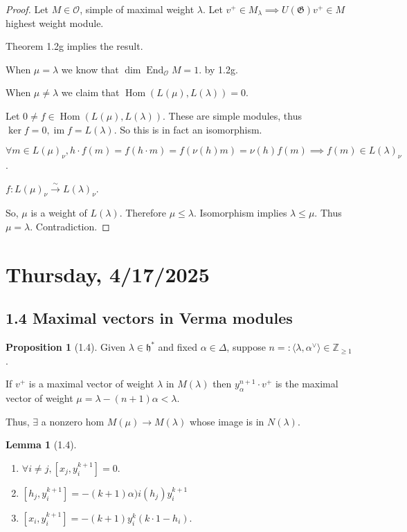 \documentclass{article}
\theoremstyle{definition}
\newtheorem{proposition}[theorem]{Proposition}
\newtheorem{lemma}[theorem]{Lemma}
\begin{document}
    \begin{proof}
        Let \(M\in \mathcal{O}\), simple of maximal weight \(\lambda\). Let \(v^+\in M_\lambda \implies U(\mathfrak{G})v^+\in M\) highest weight module.
        
        Theorem 1.2g implies the result.

        When \(\mu = \lambda\) we know that \(\dim \operatorname{End}_{\mathcal{O}}M = 1\). by 1.2g.

        When \(\mu \neq \lambda\) we claim that \(\operatorname{Hom}(L(\mu),L(\lambda)) = 0\).
        
        Let \(0\neq f \in \operatorname{Hom}(L(\mu), L(\lambda))\). These are simple modules, thus \(\ker f = 0, \operatorname{im} f = L(\lambda)\). So this is in fact an isomorphism.

        \(\forall m \in L(\mu)_\nu, h \cdot f(m) = f(h \cdot m) = f(\nu(h)m) = \nu(h) f(m) \implies f(m) \in L(\lambda)_\nu\).

        \(f: L(\mu)_\nu \xrightarrow{\sim} L(\lambda)_\nu\).

        So, \(\mu\) is a weight of \(L(\lambda)\). Therefore \(\mu \leq \lambda\). Isomorphism implies \(\lambda \leq \mu\). Thus \(\mu = \lambda\). Contradiction.
    \end{proof}

    \section{Thursday, 4/17/2025}
    
    \subsection*{1.4 Maximal vectors in Verma modules}

    \begin{proposition}
        [1.4] Given \(\lambda \in \mathfrak{h}^{\ast}\) and fixed \(\alpha \in \Delta\), suppose \(n = :\langle \lambda, \alpha^\vee \rangle \in \mathbb{Z}_{\geq 1}\).

        If \(v^+\) is a maximal vector of weight \(\lambda\) in \(M(\lambda)\) then \(y_\alpha^{n+1} \cdot v^+\) is the maximal vector of weight \(\mu = \lambda - (n+1)\alpha < \lambda\).

        Thus, \(\exists\) a nonzero hom \(M(\mu) \to M(\lambda)\) whose image is in \(N(\lambda)\).
    \end{proposition}

    \begin{lemma}
        [1.4] 

        \begin{enumerate}[label=\alph*)]
            \item \(\forall i\neq j, [x_j, y_i^{k+1}] = 0\).
            \item \([h_j, y_i^{k+1}] = -(k+1)\alpha)i(h_j) y_i^{k+1}\)
            \item \([x_i, y_i^{k+1}]=-(k+1)y_i^k (k \cdot 1 - h_i)\).    
        \end{enumerate} 
    \end{lemma}
\end{document}
